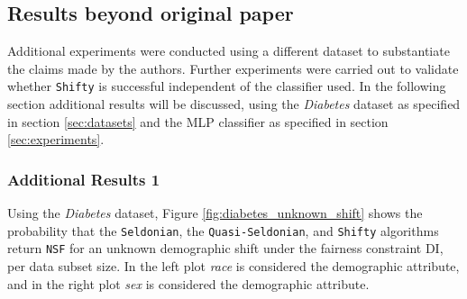 \subsection{Results beyond original paper} \label{sec:additionalresults}
Additional experiments were conducted using a different dataset to substantiate the claims made by the authors. Further experiments were carried out to validate whether \texttt{Shifty} is successful independent of the classifier used. In the following section additional results will be discussed, using the \textit{Diabetes} dataset as specified in section \ref{sec:datasets} and the MLP classifier as specified in section \ref{sec:experiments}. 

\subsubsection{Additional Results 1}
Using the \textit{Diabetes} dataset, Figure \ref{fig:diabetes_unknown_shift} shows the probability that the \texttt{Seldonian}, the \texttt{Quasi-Seldonian}, and \texttt{Shifty} algorithms return \texttt{NSF} for an unknown demographic shift under the fairness constraint DI, per data subset size. In the left plot \textit{race} is considered the demographic attribute, and in the right plot \textit{sex} is considered the demographic attribute. 

